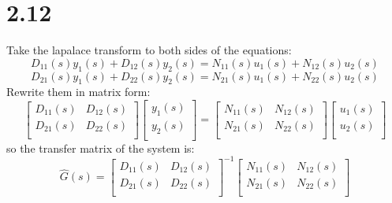 \documentclass{article}
\begin{document}
\section*{2.12}
Take the lapalace transform to both sides of the equations:
\[D_{11}(s)y_1(s)+D_{12}(s)y_2(s)=N_{11}(s)u_1(s)+N_{12}(s)u_2(s)\]
\[D_{21}(s)y_1(s)+D_{22}(s)y_2(s)=N_{21}(s)u_1(s)+N_{22}(s)u_2(s)\]
Rewrite them in matrix form:
\begin{equation*}       %
\left[                %
\begin{array}{cc}   %
D_{11}(s) & D_{12}(s) \\  %
D_{21}(s) & D_{22}(s) \\  %
\end{array}
\right]      %
\left[                %
\begin{array}{c}   %
y_1(s) \\  %
y_2(s) \\  %
\end{array}
\right]=
\left[                %
\begin{array}{cc}   %
N_{11}(s) & N_{12}(s) \\  %
N_{21}(s) & N_{22}(s) \\  %
\end{array}
\right]
\left[                %
\begin{array}{c}   %
u_1(s) \\  %
u_2(s) \\  %
\end{array}
\right]                  
\end{equation*}
so the transfer matrix of the system is:
\begin{equation*}
\hat{G}(s)=\left[                %
\begin{array}{cc}   %
D_{11}(s) & D_{12}(s) \\  %
D_{21}(s) & D_{22}(s) \\  %
\end{array}
\right]^{-1}      %
\left[                %
\begin{array}{cc}   %
N_{11}(s) & N_{12}(s) \\  %
N_{21}(s) & N_{22}(s) \\  %
\end{array}
\right]
\end{equation*}
\end{document}
